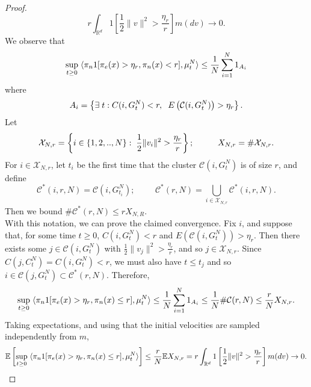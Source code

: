 \begin{proof}
\begin{equation}
    r\int_{\mathbb{R}^d}1\left[\frac{1}{2}\|v\|^2>\frac{\eta_r}{r}\right]m(dv)\rightarrow 0.
\end{equation}We observe that \begin{equation}
    \sup_{t\geq 0} \hspace{0.1cm} \langle \pi_n 1[\pi_e(x)>\eta_r, \pi_n(x)< r], \mu^N_t\rangle \leq \frac{1}{N}\sum_{i=1}^N 1_{A_i}  
\end{equation} where \begin{equation}
    A_i=\left\{\exists \hspace{0.1cm} t: C(i, G^N_t)< r, \hspace{0.2cm} E\left(\mathcal{C}(i, G^N_t)\right)> \eta_r \right\}.
\end{equation} Let \begin{equation}
    \mathcal{X}_{N,r}=\left\{i \in \{1,2,..,N\}: \hspace{0.1cm} \frac{1}{2}\|v_i\|^2>\frac{\eta_r}{r}\right\}; \hspace{1cm}X_{N,r}=\#\mathcal{X}_{N,r}.
\end{equation} For $i\in \mathcal{X}_{N,r}$, let $t_{i}$ be the first time that the cluster $\mathcal{C}(i, G^N_t)$ is of size $r$, and define \begin{equation}
    \mathcal{C}^*(i,r,N)=\mathcal{C}(i, G^N_{t_i});\hspace{1cm} \mathcal{C}^*(r,N)=\bigcup_{i\in \mathcal{X}_{N,r}} \mathcal{C}^*(i,r,N).
\end{equation} Then we bound $\#\mathcal{C}^*(r,N)\le r X_{N,R}$.  \medskip \\ With this notation, we can prove the claimed convergence. Fix $i$, and suppose that, for some time $t\geq 0$, $C(i, G^N_t)< r$ and $E(\mathcal{C}(i, G^N_t))> \eta_r.$ Then there exists some $j \in \mathcal{C}(i, G^N_t)$ with $\frac{1}{2}\|v_j\|^2 >\frac{\eta_r}{r}$, and so $j\in \mathcal{X}_{N,r}$. Since $C(j, C^N_t)=C(i, G^N_t)< r$, we must also have $t\le t_j$ and so $i\in\mathcal{C}(j,G^N_t) \subset \mathcal{C}^*(r,N).$ Therefore, \begin{equation}
    \sup_{t\geq 0} \hspace{0.1cm} \langle \pi_n 1[\pi_e(x)>\eta_r, \pi_n(x)\le r], \mu^N_t\rangle \le \frac{1}{N}\sum_{i=1}^N 1_{A_i} \le \frac{1}{N}\#\mathcal{C}(r,N) \le \frac{r}{N}X_{N,r}.
\end{equation} Taking expectations, and using that the initial velocities are sampled independently from $m$, \begin{equation} \begin{split}
    \mathbb{E}\left[\sup_{t\geq 0} \hspace{0.1cm} \langle \pi_n 1[\pi_e(x)>\eta_r, \pi_n(x)\le r], \mu^N_t\rangle\right] \le \frac{r}{N} \mathbb{E} X_{N,r}  = r\int_{\mathbb{R}^d} 1\left[\frac{1}{2}\|v\|^2>\frac{\eta_r}{r}\right]m(dv) \rightarrow 0. 
\end{split} \end{equation}\end{proof}

